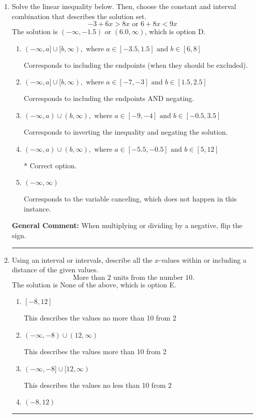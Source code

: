 \documentclass{extbook}[14pt]
\newcommand{\litem}[1]{\item #1

\rule{\textwidth}{0.4pt}}
\begin{document}
\begin{enumerate}\litem{
Solve the linear inequality below. Then, choose the constant and interval combination that describes the solution set.
\[ -3 + 6 x > 8 x \text{ or } 6 + 8 x < 9 x \]
The solution is \( (-\infty, -1.5) \text{ or } (6.0, \infty) \), which is option D.\begin{enumerate}[label=\Alph*.]
\item \( (-\infty, a] \cup [b, \infty), \text{ where } a \in [-3.5, 1.5] \text{ and } b \in [6, 8] \)

Corresponds to including the endpoints (when they should be excluded).
\item \( (-\infty, a] \cup [b, \infty), \text{ where } a \in [-7, -3] \text{ and } b \in [1.5, 2.5] \)

Corresponds to including the endpoints AND negating.
\item \( (-\infty, a) \cup (b, \infty), \text{ where } a \in [-9, -4] \text{ and } b \in [-0.5, 3.5] \)

Corresponds to inverting the inequality and negating the solution.
\item \( (-\infty, a) \cup (b, \infty), \text{ where } a \in [-5.5, -0.5] \text{ and } b \in [5, 12] \)

 * Correct option.
\item \( (-\infty, \infty) \)

Corresponds to the variable canceling, which does not happen in this instance.
\end{enumerate}

\textbf{General Comment:} When multiplying or dividing by a negative, flip the sign.
}
\litem{
Using an interval or intervals, describe all the $x$-values within or including a distance of the given values.
\[ \text{ More than } 2 \text{ units from the number } 10. \]
The solution is \( \text{None of the above} \), which is option E.\begin{enumerate}[label=\Alph*.]
\item \( [-8, 12] \)

This describes the values no more than 10 from 2
\item \( (-\infty, -8) \cup (12, \infty) \)

This describes the values more than 10 from 2
\item \( (-\infty, -8] \cup [12, \infty) \)

This describes the values no less than 10 from 2
\item \( (-8, 12) \)


\end{enumerate}}
\end{enumerate}
\end{document}
